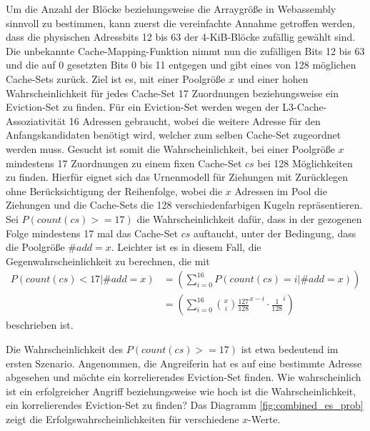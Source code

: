 Um die Anzahl der Blöcke beziehungsweise die Arraygröße in Webassembly sinnvoll zu bestimmen, kann zuerst die vereinfachte Annahme getroffen werden, dass die physischen Adressbits 12 bis 63 der 4-KiB-Blöcke zufällig gewählt sind. 
Die unbekannte Cache-Mapping-Funktion nimmt nun die zufälligen Bits 12 bis 63 und die auf 0 gesetzten Bits 0 bis 11 entgegen und gibt eines von 128 möglichen Cache-Sets zurück.
Ziel ist es, mit einer Poolgröße $x$ und einer hohen Wahrscheinlichkeit für jedes Cache-Set 17 Zuordnungen beziehungsweise ein Eviction-Set zu finden.
Für ein Eviction-Set werden wegen der L3-Cache-Assoziativität 16 Adressen gebraucht, wobei die weitere Adresse für den Anfangskandidaten benötigt wird, welcher zum selben Cache-Set zugeordnet werden muss.  
Gesucht ist somit die Wahrscheinlichkeit, bei einer Poolgröße $x$ mindestens 17 Zuordnungen zu einem fixen Cache-Set $cs$ bei 128 Möglichkeiten zu finden.
Hierfür eignet sich das Urnenmodell für Ziehungen mit Zurücklegen ohne Berücksichtigung der Reihenfolge, wobei die $x$ Adressen im Pool die Ziehungen und die Cache-Sets die 128 verschiedenfarbigen Kugeln repräsentieren. Sei $P(count(cs)>=17)$ die Wahrscheinlichkeit dafür, dass in der gezogenen Folge mindestens 17 mal das Cache-Set $cs$ auftaucht, unter der Bedingung, dass die Poolgröße $\#add = x$.
Leichter ist es in diesem Fall, die Gegenwahrscheinlichkeit zu berechnen, die mit
\begin{align*}
P(count(cs)<17|\#add = x) &=
\left( \sum\limits_{i=0}^{16}P(count(cs)=i|\#add = x) \right) \\&=
\left( \sum\limits_{i=0}^{16} {x \choose i} \frac{127}{128}^{x-i} \cdot \frac{1}{128}^i  \right)
\end{align*}
beschrieben ist.

Die Wahrscheinlichkeit des $P(count(cs)>=17)$ ist etwa bedeutend im ersten Szenario.
Angenommen, die Angreiferin hat es auf eine bestimmte Adresse abgesehen und möchte ein korrelierendes Eviction-Set finden. 
Wie wahrscheinlich ist ein erfolgreicher Angriff beziehungsweise wie hoch ist die Wahrscheinlichkeit, ein korrelierendes Eviction-Set zu finden? 
Das Diagramm \ref{fig:combined_es_prob} zeigt die Erfolgswahrscheinlichkeiten für verschiedene $x$-Werte. 


